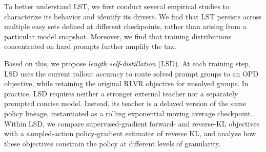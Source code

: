 \documentclass{article} %
\begin{document}
To better understand LST, we first conduct several empirical studies to characterize
its behavior and identify its drivers. We find that LST persists across
multiple easy sets defined at different checkpoints, rather than arising from a particular model snapshot. Moreover, we find that training distributions concentrated on hard prompts further amplify the tax.

Based on this, we propose \emph{length self-distillation} (LSD).
At each training step, LSD uses the current rollout accuracy to route solved
prompt groups to an OPD objective, while retaining the original RLVR objective
for unsolved groups. In practice,
LSD requires neither a stronger external teacher nor a separately prompted
concise model. Instead, its teacher is a delayed version of the same policy
lineage, instantiated as a rolling
exponential moving average checkpoint. Within LSD, we compare supervised-gradient forward- and reverse-KL objectives with a
sampled-action policy-gradient estimator of reverse KL, and analyze how these objectives constrain the policy at different levels of granularity.


\end{document}
